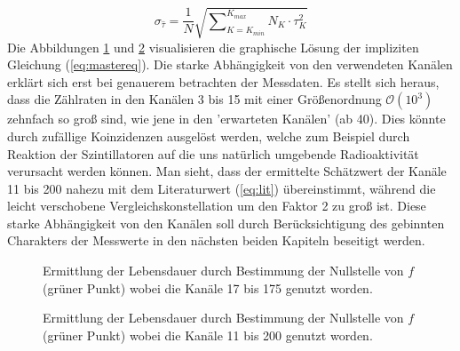 		\begin{equation} 
			\sigma_{\hat{\tau}} = \frac{1}{N}\sqrt{\sum\nolimits_{K=K_{min}}^{K_{max}} N_K\cdot \tau_K^2}
		\end{equation}	
	Die Abbildungen \ref{fig:LDexpZerf1} und \ref{fig:LDexpZerf2} visualisieren die graphische Lösung der impliziten Gleichung (\ref{eq:mastereq}). Die starke Abhängigkeit von den verwendeten Kanälen erklärt sich erst bei genauerem betrachten der Messdaten. Es stellt sich heraus, dass die Zählraten in den Kanälen 3 bis 15  mit einer Größenordnung $\mathcal{O}(10^3)$ zehnfach so groß sind, wie jene in den 'erwarteten Kanälen' (ab 40). Dies könnte durch zufällige Koinzidenzen ausgelöst werden, welche zum Beispiel durch Reaktion der Szintillatoren auf die uns natürlich umgebende Radioaktivität verursacht werden können. Man sieht, dass der ermittelte Schätzwert der Kanäle 11 bis 200 nahezu mit dem Literaturwert (\ref{eq:lit}) übereinstimmt, während die leicht verschobene Vergleichskonstellation um den Faktor 2 zu groß ist. Diese starke Abhängigkeit von den Kanälen soll durch Berücksichtigung des gebinnten Charakters der Messwerte in den nächsten beiden Kapiteln beseitigt werden. \\
		\begin{figure}[Hp]
		    \centering
		    \captionsetup{justification=centering}
			\caption{Ermittlung der Lebensdauer durch Bestimmung der Nullstelle von $f$ (grüner Punkt) wobei die Kanäle 17 bis 175 genutzt worden.}
			\label{fig:LDexpZerf1}
		\end{figure}	
		
		\begin{figure}[Hp]
			\centering
			\captionsetup{justification=centering}
		    \caption{Ermittlung der Lebensdauer durch Bestimmung der Nullstelle von $f$ (grüner Punkt) wobei die Kanäle 11 bis 200 genutzt worden.}
		    \label{fig:LDexpZerf2}
		\end{figure}
			
